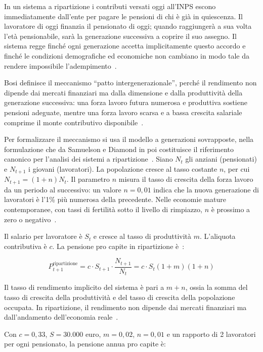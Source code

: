 In un sistema a ripartizione i contributi versati oggi all'INPS escono immediatamente dall'ente per pagare le pensioni di chi è già in quiescenza. Il lavoratore di oggi finanzia il pensionato di oggi; quando raggiungerà a sua volta l'età pensionabile, sarà la generazione successiva a coprire il suo assegno. Il sistema regge finché ogni generazione accetta implicitamente questo accordo e finché le condizioni demografiche ed economiche non cambiano in modo tale da rendere impossibile l'adempimento~\cite{Bosi2018}.

Bosi definisce il meccanismo ``patto intergenerazionale'', perché il rendimento non dipende dai mercati finanziari ma dalla dimensione e dalla produttività della generazione successiva: una forza lavoro futura numerosa e produttiva sostiene pensioni adeguate, mentre una forza lavoro scarsa e a bassa crescita salariale comprime il monte contributivo disponibile~\cite{Bosi2018}.

Per formalizzare il meccanismo si usa il modello a generazioni sovrapposte, nella formulazione che da Samuelson e Diamond in poi costituisce il riferimento canonico per l'analisi dei sistemi a ripartizione~\cite{Samuelson1958, Diamond1965, Bosi2018}. Siano \(N_t\) gli anziani (pensionati) e \(N_{t+1}\) i giovani (lavoratori). La popolazione cresce al tasso costante \(n\), per cui \(N_{t+1} = (1+n)N_t\). Il parametro \(n\) misura il tasso di crescita della forza lavoro da un periodo al successivo: un valore \(n = 0{,}01\) indica che la nuova generazione di lavoratori è l'1\% più numerosa della precedente. Nelle economie mature contemporanee, con tassi di fertilità sotto il livello di rimpiazzo, \(n\) è prossimo a zero o negativo~\cite{Bosi2018, RosenGayerRapallini2023}.

Il salario per lavoratore è \(S_t\) e cresce al tasso di produttività \(m\). L'aliquota contributiva è \(c\). La pensione pro capite in ripartizione è~\cite{Bosi2018, RosenGayerRapallini2023}:

\[
P_{t+1}^{\text{ripartizione}} = c \cdot S_{t+1} \cdot \frac{N_{t+1}}{N_t} = c \cdot S_t (1+m)(1+n)
\]

Il tasso di rendimento implicito del sistema è pari a \(m+n\), ossia la somma del tasso di crescita della produttività e del tasso di crescita della popolazione occupata. In ripartizione, il rendimento non dipende dai mercati finanziari ma dall'andamento dell'economia reale~\cite{RosenGayerRapallini2023}.

Con \(c=0{,}33\), \(S=30.000\) euro, \(m=0{,}02\), \(n=0{,}01\) e un rapporto di 2 lavoratori per ogni pensionato, la pensione annua pro capite è:


